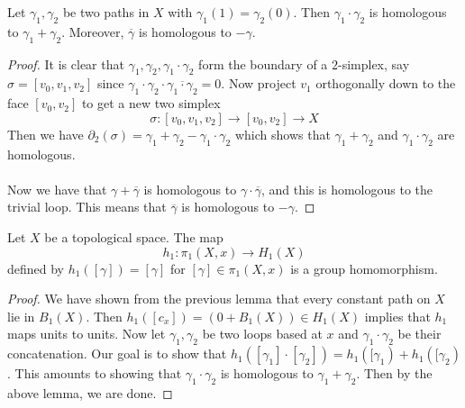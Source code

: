 \documentclass[a4paper]{article}
\begin{document}
\begin{lmm}{}{} Let $\gamma_1,\gamma_2$ be two paths in $X$ with $\gamma_1(1)=\gamma_2(0)$. Then $\gamma_1\cdot\gamma_2$ is homologous to $\gamma_1+\gamma_2$. Moreover, $\overline{\gamma}$ is homologous to $-\gamma$. \tcbline
\begin{proof}
It is clear that $\gamma_1,\gamma_2,\gamma_1\cdot\gamma_2$ form the boundary of a $2$-simplex, say $\sigma=[v_0,v_1,v_2]$ since $\gamma_1\cdot\gamma_2\cdot\overline{\gamma_1\cdot\gamma_2}=0$. Now project $v_1$ orthogonally down to the face $[v_0,v_2]$ to get a new two simplex $$\sigma:[v_0,v_1,v_2]\to[v_0,v_2]\to X$$ Then we have $\partial_2(\sigma)=\gamma_1+\gamma_2-\gamma_1\cdot\gamma_2$ which shows that $\gamma_1+\gamma_2$ and $\gamma_1\cdot\gamma_2$ are homologous. \\~\\

Now we have that $\gamma+\overline{\gamma}$ is homologous to $\gamma\cdot\overline{\gamma}$, and this is homologous to the trivial loop. This means that $\overline{\gamma}$ is homologous to $-\gamma$. 
\end{proof}
\end{lmm}

\begin{prp}{}{} Let $X$ be a topological space. The map $$h_1:\pi_1(X,x)\to H_1(X)$$ defined by $h_1([\gamma])=[\gamma]$ for $[\gamma]\in\pi_1(X,x)$ is a group homomorphism. \tcbline
\begin{proof}
We have shown from the previous lemma that every constant path on $X$ lie in $B_1(X)$. Then $h_1([c_x])=(0+B_1(X))\in H_1(X)$ implies that $h_1$ maps units to units. Now let $\gamma_1,\gamma_2$ be two loops based at $x$ and $\gamma_1\cdot\gamma_2$ be their concatenation. Our goal is to show that $h_1([\gamma_1]\cdot[\gamma_2])=h_1([\gamma_1)+h_1([\gamma_2)$. This amounts to showing that $\gamma_1\cdot\gamma_2$ is homologous to $\gamma_1+\gamma_2$. Then by the above lemma, we are done. 
\end{proof}
\end{prp}
\end{document}
